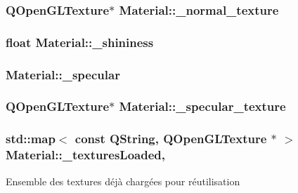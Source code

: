 \hypertarget{class_material_add78622071d92485dd37dbd1934453b3}{
\subsubsection[{\+\_\+normal\+\_\+texture}]{\setlength{\rightskip}{0pt plus 5cm}Q\+Open\+G\+L\+Texture$\ast$ Material\+::\+\_\+normal\+\_\+texture\hspace{0.3cm}{\ttfamily [private]}}}\label{class_material_add78622071d92485dd37dbd1934453b3}
\hypertarget{class_material_ae3f666b9de93b770232ebb5b1b3ee47e}{
\subsubsection[{\+\_\+shininess}]{\setlength{\rightskip}{0pt plus 5cm}float Material\+::\+\_\+shininess\hspace{0.3cm}{\ttfamily [private]}}}\label{class_material_ae3f666b9de93b770232ebb5b1b3ee47e}
\hypertarget{class_material_aa86eef19901a701e22ef3ddd7b9c8ec2}{
\subsubsection[{\+\_\+specular}]{ Material\+::\+\_\+specular\hspace{0.3cm}{\ttfamily [private]}}}\label{class_material_aa86eef19901a701e22ef3ddd7b9c8ec2}
\hypertarget{class_material_a15711d6d794b6ea122e38738fa73ba8a}{
\subsubsection[{\+\_\+specular\+\_\+texture}]{\setlength{\rightskip}{0pt plus 5cm}Q\+Open\+G\+L\+Texture$\ast$ Material\+::\+\_\+specular\+\_\+texture\hspace{0.3cm}{\ttfamily [private]}}}\label{class_material_a15711d6d794b6ea122e38738fa73ba8a}
\hypertarget{class_material_a9ccbb6b22b224284050b4d6c172829fc}{
\subsubsection[{\+\_\+textures\+Loaded}]{\setlength{\rightskip}{0pt plus 5cm}std\+::map$<$ const Q\+String, Q\+Open\+G\+L\+Texture $\ast$ $>$ Material\+::\+\_\+textures\+Loaded\hspace{0.3cm}{\ttfamily [static]}, {\ttfamily [private]}}}\label{class_material_a9ccbb6b22b224284050b4d6c172829fc}
Ensemble des textures déjà chargées pour réutilisation 


